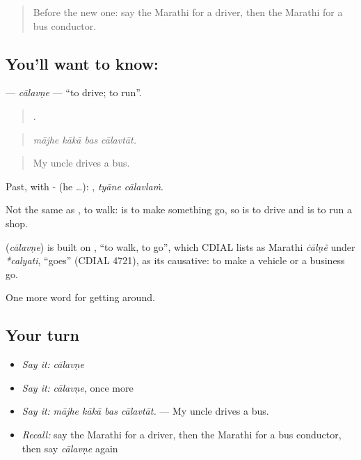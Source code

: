 \label{lesson:MR-C399-calavne}



\begin{quote}
Before the new one: say the Marathi for a driver, then the Marathi for a bus conductor.
\end{quote}

\subsection*{You'll want to know: }
\textbf{} — \emph{cālavṇe} — \textquotedblleft{}to drive; to run\textquotedblright{}.

\begin{quote}
   .
\end{quote}

\begin{quote}
\emph{mājhe kākā bas cālavtāt.}
\end{quote}

\begin{quote}
My uncle drives a bus.
\end{quote}

Past, with - (he …):  , \emph{tyāne cālavlaṁ}.

Not the same as , to walk:  is to make something go, so   is to drive and   is to run a shop.

\begin{cousinweb}
\textbf{} (\emph{cālavṇe}) is built on \textbf{}, \textquotedblleft{}to walk, to go\textquotedblright{}, which CDIAL lists as Marathi \emph{ċālṇẽ} under \emph{*calyati}, \textquotedblleft{}goes\textquotedblright{} (CDIAL 4721), as its causative: to make a vehicle or a business go.
\end{cousinweb}

\begin{grammarlens}[title={What you've built}]
One more word for getting around.
\end{grammarlens}

\subsection*{Your turn}
\begin{itemize}
\raggedright
  \item \emph{Say it:} \emph{cālavṇe}
  \item \emph{Say it:} \emph{cālavṇe}, once more
  \item \emph{Say it:} \emph{mājhe kākā bas cālavtāt.} — My uncle drives a bus.
  \item \emph{Recall:} say the Marathi for a driver, then the Marathi for a bus conductor, then say \emph{cālavṇe} again
\end{itemize}

